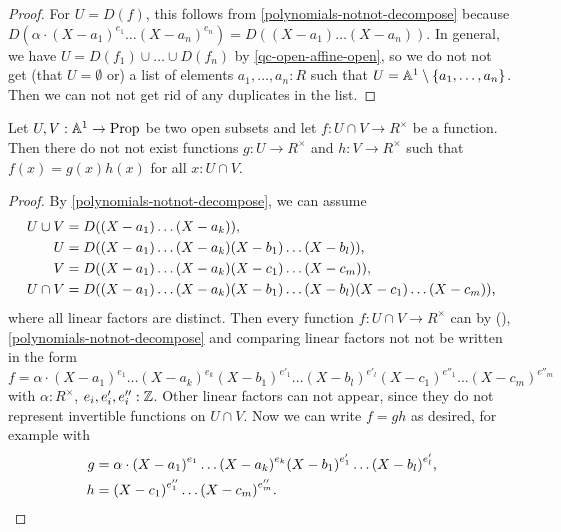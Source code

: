 \begin{proof}
  For $U = D(f)$,
  this follows from \cref{polynomials-notnot-decompose}
  because $D(\alpha \cdot {(X - a_1)}^{e_1} \dots {(X - a_n)}^{e_n})
  = D((X - a_1) \dots (X - a_n))$.
  In general,
  we have $U = D(f_1) \cup \dots \cup D(f_n)$
  by \cref{qc-open-affine-open},
  so we do not not get
  (that $U = \emptyset$ or)
  a list of elements $a_1, \dots, a_n : R$
  such that $U = \mathbb{A}^1 \setminus \{ a_1, \dots, a_n \}$.
  Then we can not not get rid of any duplicates in the list.
\end{proof}

\begin{lemma}%
  \label{decompose-invertible-function-on-intersection-in-A1}
  Let $U, V : \mathbb{A}^1 \to \mathrm{Prop}$ be two open subsets
  and let $f : U \cap V \to R^\times$ be a function.
  Then there do not not exist functions
  $g : U \to R^\times$ and
  $h : V \to R^\times$
  such that $f(x) = g(x)h(x)$ for all $x : U \cap V$.
\end{lemma}

\begin{proof}
  By \cref{polynomials-notnot-decompose},
  we can assume
  \begin{align*}
    U \cup V &= D((X - a_1) \dots (X - a_k)) \rlap{,}\\
    U &= D((X - a_1) \dots (X - a_k) (X - b_1) \dots (X - b_l)) \rlap{,}\\
    V &= D((X - a_1) \dots (X - a_k) (X - c_1) \dots (X - c_m)) \rlap{,}\\
    U \cap V &= D((X - a_1) \dots (X - a_k) (X - b_1) \dots (X - b_l) (X - c_1) \dots (X - c_m))
    \rlap{,}
  \end{align*}
  where all linear factors are distinct.
  Then every function $f : U \cap V \to R^\times$ can
  by (), \cref{polynomials-notnot-decompose}
  and comparing linear factors
  not not be written in the form
  \[ f = \alpha \cdot
     {(X - a_1)}^{e_1} \dots {(X - a_k)}^{e_k}
     {(X - b_1)}^{e'_1} \dots {(X - b_l)}^{e'_l}
     {(X - c_1)}^{e''_1} \dots {(X - c_m)}^{e''_m}
  \]
  with $\alpha : R^\times$, $e_i, e'_i, e''_i : \mathbb{Z}$.
  Other linear factors can not appear,
  since they do not represent invertible functions on $U \cap V$.
  Now we can write $f = gh$ as desired,
  for example with
  \begin{align*}
    g &= \alpha \cdot
    {(X - a_1)}^{e_1} \dots {(X - a_k)}^{e_k}
    {(X - b_1)}^{e'_1} \dots {(X - b_l)}^{e'_l} \rlap{,}\\
    h &=
    {(X - c_1)}^{e''_1} \dots {(X - c_m)}^{e''_m} \rlap{.}
  \end{align*}
\end{proof}

